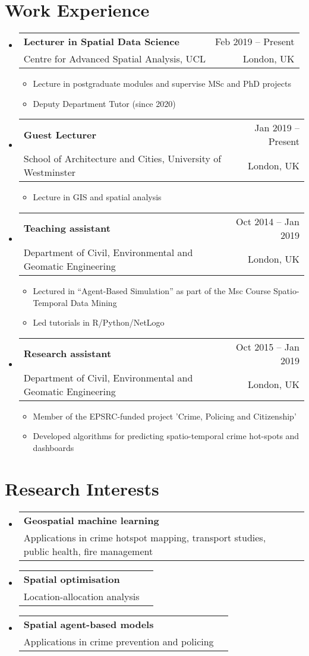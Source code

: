 \documentclass[A4,11pt]{article}
\makeatletter
\newcommand{\CVItem}[1]{
  \item\small{
    {#1 \vspace{-2pt}}
  }
}
\newcommand{\CVSubheading}[4]{
  \vspace{-2pt}\item
    \begin{tabular*}{0.97\textwidth}[t]{l@{\extracolsep{\fill}}r}
      \textbf{#1} & #2 \\
      \small#3 & \small #4 \\
    \end{tabular*}\vspace{-7pt}
}
\newcommand{\CVSubHeadingListStart}{\begin{itemize}[leftmargin=0.5cm, label={}]}
\newcommand{\CVSubHeadingListEnd}{\end{itemize}}
\newcommand{\CVItemListStart}{\begin{itemize}}
\newcommand{\CVItemListEnd}{\end{itemize}\vspace{-5pt}}
\makeatother
\begin{document}
\section{Work Experience}
  \CVSubHeadingListStart
    \CVSubheading
      {Lecturer in Spatial Data Science}{Feb 2019 -- Present}
      {Centre for Advanced Spatial Analysis, UCL}{London, UK}
      \CVItemListStart
        \CVItem{Lecture in postgraduate modules and supervise MSc and PhD projects}        
        \CVItem{Deputy Department Tutor (since 2020)}
      \CVItemListEnd
    \CVSubheading
      {Guest Lecturer}{Jan 2019 -- Present}
      {School of Architecture and Cities, University of Westminster}{London, UK}
      \CVItemListStart
        \CVItem{Lecture in GIS and spatial analysis}
    \CVItemListEnd
    \CVSubheading
      {Teaching assistant}{Oct 2014 -- Jan 2019}
      {Department of Civil, Environmental and Geomatic Engineering}{London, UK}
      \CVItemListStart
        \CVItem{Lectured in “Agent-Based Simulation” as part of the Msc Course Spatio-Temporal Data Mining}
        \CVItem{Led tutorials in R/Python/NetLogo}
      \CVItemListEnd
     \CVSubheading
      {Research assistant}{Oct 2015 -- Jan 2019}
      {Department of Civil, Environmental and Geomatic Engineering}{London, UK}
      \CVItemListStart
        \CVItem{Member of the EPSRC-funded project 'Crime, Policing and Citizenship'}
        \CVItem{Developed algorithms for predicting spatio-temporal crime hot-spots and dashboards}
      \CVItemListEnd
  \CVSubHeadingListEnd

\begin{comment}
try to briefly explain what you did and why it is relevant to the position you
are seeking
\end{comment}

\section{Research Interests}
  \CVSubHeadingListStart
    \CVSubheading
      {Geospatial machine learning}{}
      {Applications in crime hotspot mapping, transport studies, public health, fire management}{}
    \CVSubheading
      {Spatial optimisation}{}
      {Location-allocation analysis}{}
    \CVSubheading
      {Spatial agent-based models}{}
      {Applications in crime prevention and policing}{}
  \CVSubHeadingListEnd
\end{document}
